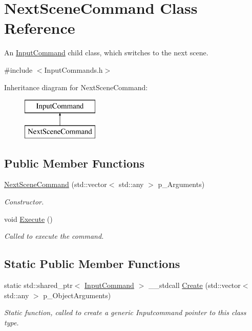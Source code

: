 \hypertarget{class_next_scene_command}{}\section{Next\+Scene\+Command Class Reference}
\label{class_next_scene_command}


An \mbox{\hyperlink{class_input_command}{Input\+Command}} child class, which switches to the next scene.  




{\ttfamily \#include $<$Input\+Commands.\+h$>$}

Inheritance diagram for Next\+Scene\+Command\+:\begin{figure}[H]
\begin{center}
\leavevmode
\includegraphics[height=2.000000cm]{class_next_scene_command}
\end{center}
\end{figure}
\subsection*{Public Member Functions}
\begin{DoxyCompactItemize}
\item 
\mbox{\hyperlink{class_next_scene_command_a96a3b620d5d9bf6760e73f17ff2895d2}{Next\+Scene\+Command}} (std\+::vector$<$ std\+::any $>$ p\+\_\+\+Arguments)
\begin{DoxyCompactList}\small\item\em Constructor. \end{DoxyCompactList}\item 
\mbox{\label{class_next_scene_command_a3908c4efd7163a151832959c577d7234}} 
void \mbox{\hyperlink{class_next_scene_command_a3908c4efd7163a151832959c577d7234}{Execute}} ()
\begin{DoxyCompactList}\small\item\em Called to execute the command. \end{DoxyCompactList}\end{DoxyCompactItemize}
\subsection*{Static Public Member Functions}
\begin{DoxyCompactItemize}
\item 
static std\+::shared\+\_\+ptr$<$ \mbox{\hyperlink{class_input_command}{Input\+Command}} $>$ \+\_\+\+\_\+stdcall \mbox{\hyperlink{class_next_scene_command_ab2fa1c82edea29992e310a48cc4358f4}{Create}} (std\+::vector$<$ std\+::any $>$ p\+\_\+\+Object\+Arguments)
\begin{DoxyCompactList}\small\item\em Static function, called to create a generic Inputcommand pointer to this class type. \end{DoxyCompactList}\end{DoxyCompactItemize}

